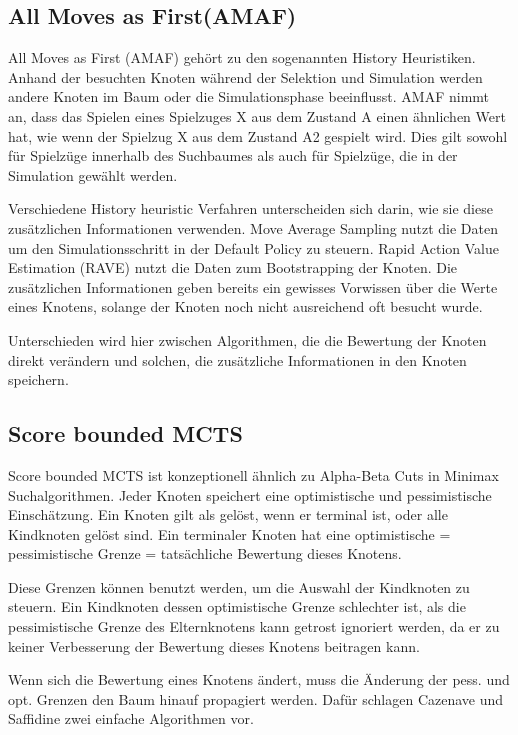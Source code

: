 \subsection{All Moves as First(AMAF)}
All Moves as First (AMAF) gehört zu den sogenannten History Heuristiken. Anhand der besuchten Knoten während der Selektion und Simulation werden andere Knoten im Baum oder die Simulationsphase beeinflusst. AMAF nimmt an, dass das Spielen eines Spielzuges X aus dem Zustand A einen ähnlichen Wert hat, wie wenn der Spielzug X aus dem Zustand A2 gespielt wird. Dies gilt sowohl für Spielzüge innerhalb des Suchbaumes als auch für Spielzüge, die in der Simulation gewählt werden.
\par
Verschiedene History heuristic Verfahren unterscheiden sich darin, wie sie diese zusätzlichen Informationen verwenden. Move Average Sampling nutzt die Daten um den Simulationsschritt in der Default Policy zu steuern. Rapid Action Value Estimation (RAVE) nutzt die Daten zum Bootstrapping der Knoten. Die zusätzlichen Informationen geben bereits ein gewisses Vorwissen über die Werte eines Knotens, solange der Knoten noch nicht ausreichend oft besucht wurde.
\par
Unterschieden wird hier zwischen Algorithmen, die die Bewertung der Knoten direkt verändern und solchen, die zusätzliche Informationen in den Knoten speichern.


\subsection{Score bounded MCTS}
Score bounded MCTS ist konzeptionell ähnlich zu Alpha-Beta Cuts in Minimax Suchalgorithmen. Jeder Knoten speichert eine optimistische und pessimistische Einschätzung. Ein Knoten gilt als gelöst, wenn er terminal ist, oder alle Kindknoten gelöst sind. Ein terminaler Knoten hat eine optimistische = pessimistische Grenze = tatsächliche Bewertung dieses Knotens.\\
\par
Diese Grenzen können benutzt werden, um die Auswahl der Kindknoten zu steuern. Ein Kindknoten dessen optimistische Grenze schlechter ist, als die pessimistische Grenze des Elternknotens kann getrost ignoriert werden, da er zu keiner Verbesserung der Bewertung dieses Knotens beitragen kann.\\
\par
Wenn sich die Bewertung eines Knotens ändert, muss die Änderung der pess. und opt. Grenzen den Baum hinauf propagiert werden. Dafür schlagen Cazenave und Saffidine zwei einfache Algorithmen vor.

